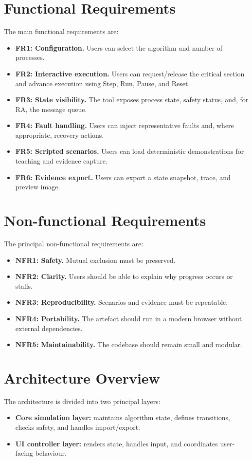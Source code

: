 \section{Functional Requirements}
The main functional requirements are:
\begin{itemize}
  \item \textbf{FR1: Configuration.} Users can select the algorithm and number of processes.
  \item \textbf{FR2: Interactive execution.} Users can request/release the critical section and advance execution using Step, Run, Pause, and Reset.
  \item \textbf{FR3: State visibility.} The tool exposes process state, safety status, and, for RA, the message queue.
  \item \textbf{FR4: Fault handling.} Users can inject representative faults and, where appropriate, recovery actions.
  \item \textbf{FR5: Scripted scenarios.} Users can load deterministic demonstrations for teaching and evidence capture.
  \item \textbf{FR6: Evidence export.} Users can export a state snapshot, trace, and preview image.
\end{itemize}

\section{Non-functional Requirements}
The principal non-functional requirements are:
\begin{itemize}
  \item \textbf{NFR1: Safety.} Mutual exclusion must be preserved.
  \item \textbf{NFR2: Clarity.} Users should be able to explain why progress occurs or stalls.
  \item \textbf{NFR3: Reproducibility.} Scenarios and evidence must be repeatable.
  \item \textbf{NFR4: Portability.} The artefact should run in a modern browser without external dependencies.
  \item \textbf{NFR5: Maintainability.} The codebase should remain small and modular.
\end{itemize}

\section{Architecture Overview}
The architecture is divided into two principal layers:
\begin{itemize}
  \item \textbf{Core simulation layer:} maintains algorithm state, defines transitions, checks safety, and handles import/export.
  \item \textbf{UI controller layer:} renders state, handles input, and coordinates user-facing behaviour.
\end{itemize}

